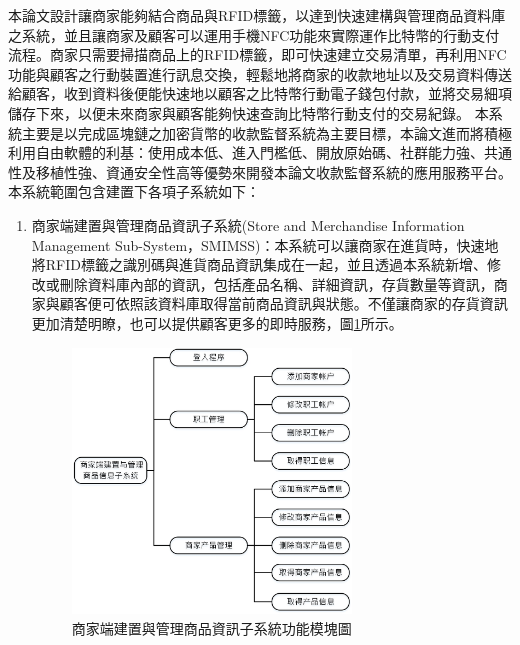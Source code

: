 	本論文設計讓商家能夠結合商品與RFID標籤，以達到快速建構與管理商品資料庫之系統，並且讓商家及顧客可以運用手機NFC功能來實際運作比特幣的行動支付流程。商家只需要掃描商品上的RFID標籤，即可快速建立交易清單，再利用NFC功能與顧客之行動裝置進行訊息交換，輕鬆地將商家的收款地址以及交易資料傳送給顧客，收到資料後便能快速地以顧客之比特幣行動電子錢包付款，並將交易細項儲存下來，以便未來商家與顧客能夠快速查詢比特幣行動支付的交易紀錄。
	本系統主要是以完成區塊鏈之加密貨幣的收款監督系統為主要目標，本論文進而將積極利用自由軟體的利基：使用成本低、進入門檻低、開放原始碼、社群能力強、共通性及移植性強、資通安全性高等優勢來開發本論文收款監督系統的應用服務平台。本系統範圍包含建置下各項子系統如下：
		\begin{enumerate}
		\item 商家端建置與管理商品資訊子系統(Store and Merchandise Information Management Sub-System，SMIMSS)：本系統可以讓商家在進貨時，快速地將RFID標籤之識別碼與進貨商品資訊集成在一起，並且透過本系統新增、修改或刪除資料庫內部的資訊，包括產品名稱、詳細資訊，存貨數量等資訊，商家與顧客便可依照該資料庫取得當前商品資訊與狀態。不僅讓商家的存貨資訊更加清楚明瞭，也可以提供顧客更多的即時服務，圖\ref{model1}所示。

			\begin{figure}[!htbp]
			\centering
			\includegraphics[width = 0.7\textwidth]{model1.jpg}
			\caption{商家端建置與管理商品資訊子系統功能模塊圖}\label{model1}
			\end{figure}




\end{enumerate}
